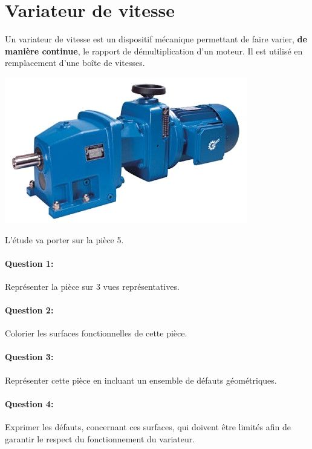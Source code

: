 

\section{Variateur de vitesse}

\begin{minipage}{0.6\linewidth}
 Un variateur de vitesse est un dispositif mécanique permettant de faire varier, \textbf{de manière continue}, le rapport de démultiplication d'un moteur. Il est utilisé en remplacement d'une boîte de vitesses.
\end{minipage}
\hfill
\begin{minipage}{0.35\linewidth}
 \centering\includegraphics[width=0.9\linewidth]{img/variat}
\end{minipage}

L'étude va porter sur la pièce 5.

\paragraph{Question 1:} Représenter la pièce sur 3 vues représentatives.

\paragraph{Question 2:} Colorier les surfaces fonctionnelles de cette pièce.

\paragraph{Question 3:} Représenter cette pièce en incluant un ensemble de défauts géométriques.

\paragraph{Question 4:} Exprimer les défauts, concernant ces surfaces, qui doivent être limités afin de garantir le respect du fonctionnement du variateur.

